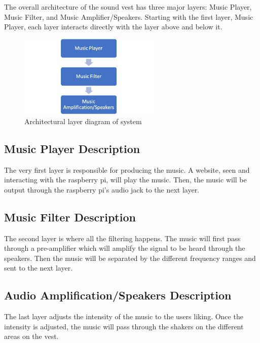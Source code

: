 The overall architecture of the sound vest has three major layers: Music Player, Music Filter, and Music Amplifier/Speakers. Starting with the first layer, Music Player, each layer interacts directly with the layer above and below it.
\begin{figure}[h!]
	\centering
 	\includegraphics[width=0.60\textwidth]{images/layers}
 \caption{Architectural layer diagram of system}
\end{figure}

\subsection{Music Player Description}
The very first layer is responsible for producing the music. A website, seen and interacting with the raspberry pi, will play the music. Then, the music will be output through the raspberry pi's audio jack to the next layer. 

\subsection{Music Filter Description}
The second layer is where all the filtering happens. The music will first pass through a pre-amplifier which will amplify the signal to be heard through the speakers. Then the music will be separated by the different frequency ranges and sent to the next layer. 

\subsection{Audio Amplification/Speakers Description}
The last layer adjusts the intensity of the music to the users liking. Once the intensity is adjusted, the music will pass through the shakers on the different areas on the vest. 
